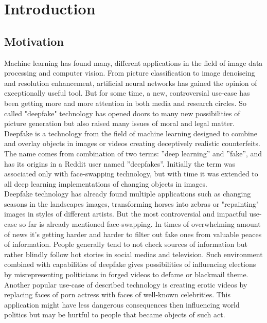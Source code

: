 \chapter{Introduction}
\section{Motivation}
Machine learning has found many, different applications in the field of image data processing and computer vision. From picture classification to image denoiseing and resolution enhancement, artificial neural networks has gained the opinion of exceptionally useful tool. But for some time, a new, controversial use-case has been getting more and more attention in both media and research circles. So called "deepfake" technology has opened doors to many new possibilities of picture generation but also raised many issues of moral and legal matter.\\

Deepfake is a technology from the field of machine learning designed to combine and overlay objects in images or videos creating deceptively realistic counterfeits. The name comes from combination of two terms: ''deep learning'' and ''fake'', and has its origins in a Reddit user named ''deepfakes''. Initially the term was associated only with face-swapping technology, but with time it was extended to all deep learning implementations of changing objects in images.\\

Deepfake technology has already found multiple applications such as changing seasons in the landscapes images, transforming horses into zebras or "repainting" images in styles of different artists. But the most controversial and impactful use-case so far is already mentioned face-swapping. In times of overwhelming amount of news it's getting harder and harder to filter out fake ones from valuable peaces of information. People generally tend to not check sources of information but rather blindly follow hot stories in social medias and television. Such environment combined with capabilities of deepfake gives possibilities of influencing elections by misrepresenting politicians in forged videos to defame or blackmail theme. Another popular use-case of described technology is creating erotic videos by replacing faces of porn actress with faces of well-known celebrities. This application might have less dangerous consequences then influencing world politics but may be hurtful to people that became objects of such act.\\

